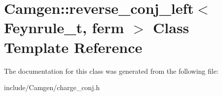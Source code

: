 \hypertarget{a00476}{}\section{Camgen\+:\+:reverse\+\_\+conj\+\_\+left$<$ Feynrule\+\_\+t, ferm $>$ Class Template Reference}
\label{a00476}


The documentation for this class was generated from the following file\+:\begin{DoxyCompactItemize}
\item 
include/\+Camgen/charge\+\_\+conj.\+h\end{DoxyCompactItemize}
